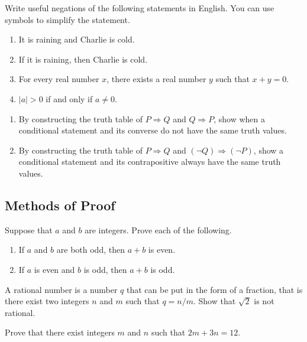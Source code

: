  \begin{problem}
 Write useful negations of the following statements in English. You can use symbols to simplify the statement.
 	\begin{enumerate}[label=\alph*)]
 		\item It is raining and Charlie is cold.
 		\item If it is raining, then Charlie is cold.
 		\item For every real number $x$, there exists a real number $y$ such that $x  +y = 0$.
 		\item $|a| > 0$ if and only if $a \neq 0$.
 	\end{enumerate}
 \end{problem}

 \begin{problem}
 	\begin{enumerate}[label=\alph*)]
 		\item  By constructing the truth table of $P \Rightarrow Q$ and $Q \Rightarrow P$, show when a conditional statement and its converse do not have the same truth values.
 		\item By constructing the truth table of $P \Rightarrow Q$ and $(\neg Q) \Rightarrow (\neg P)$, show a conditional statement and its contrapositive always have the same truth values.
 	\end{enumerate}
 \end{problem}

 \subsection[~~Methods of Proof]{Methods of Proof}

 \begin{problem}
 Suppose that $a$ and $b$ are integers. Prove each of the following.
 	\begin{enumerate}[label=\alph*)]
 		\item If $a$ and $b$ are both odd, then $a + b$ is even.
 		\item If $a$ is even and $b$ is odd, then $a + b$ is odd.
 	\end{enumerate}
 \end{problem}

 \begin{problem}
 A rational number is a number $q$ that can be put in the form of a fraction, that is there exist two integers $n$ and $m$ such that $q = n / m$. Show that $\sqrt{2}$ is not rational.
 \end{problem}

 \begin{problem}
 Prove that there exist integers $m$ and $n$ such that $2m + 3n = 12$.
 \end{problem}

